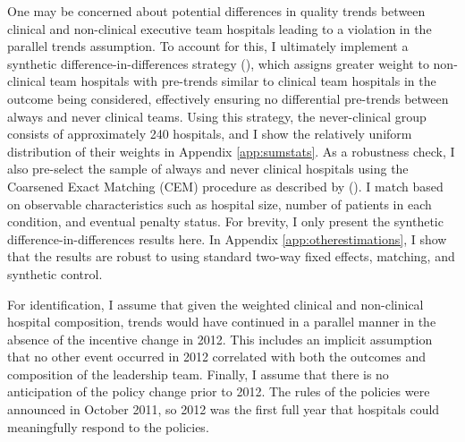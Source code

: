 \documentclass[12pt]{article}
\begin{document}
    One may be concerned about potential differences in quality trends between clinical and non-clinical executive team hospitals leading to a violation in the parallel trends assumption. To account for this, I ultimately implement a synthetic difference-in-differences strategy (\cite{arkhangelsky2021synthetic}), which assigns greater weight to non-clinical team hospitals with pre-trends similar to clinical team hospitals in the outcome being considered, effectively ensuring no differential pre-trends between always and never clinical teams. Using this strategy, the never-clinical group consists of approximately 240 hospitals, and I show the relatively uniform distribution of their weights in Appendix \ref{app:sumstats}. As a robustness check, I also pre-select the sample of always and never clinical hospitals using the Coarsened Exact Matching (CEM) procedure as described by \citeauthor{azoulay2010superstar} (\citeyear{azoulay2010superstar}). I match based on observable characteristics such as hospital size, number of patients in each condition, and eventual penalty status. For brevity, I only present the synthetic difference-in-differences results here. In Appendix \ref{app:otherestimations}, I show that the results are robust to using standard two-way fixed effects, matching, and synthetic control. 
    
    For identification, I assume that given the weighted clinical and non-clinical hospital composition, trends would have continued in a parallel manner in the absence of the incentive change in 2012. This includes an implicit assumption that no other event occurred in 2012 correlated with both the outcomes and composition of the leadership team. Finally, I assume that there is no anticipation of the policy change prior to 2012. The rules of the policies were announced in October 2011, so 2012 was the first full year that hospitals could meaningfully respond to the policies.
\end{document}
